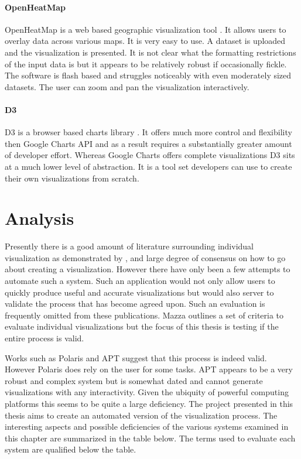 \documentclass[a4paper, 11pt, titlepage, onehalfspacing]{report}
\begin{document}
\paragraph{OpenHeatMap}
OpenHeatMap is a web based geographic visualization tool \cite{openheatmap}. It allows users to overlay data across various maps. It is very easy to use. A dataset is uploaded and the visualization is presented. It is not clear what the formatting restrictions of the input data is but it appears to be relatively robust if occasionally fickle. The software is flash based and struggles noticeably with even moderately sized datasets. The user can zoom and pan the visualization interactively.
\paragraph{D3}
D3 is a browser based charts library \cite{d3}. It offers much more control and flexibility then Google Charts API and as a result requires a substantially greater amount of developer effort. Whereas Google Charts offers complete visualizations D3 sits at a much lower level of abstraction. It is a tool set developers can use to create their own visualizations from scratch. 


\section{Analysis}
Presently there is a good amount of literature surrounding individual visualization as demonstrated by \cite{mazza2009introduction}, and large degree of consensus on how to go about creating a visualization. However there have only been a few attempts to automate such a system. Such an application would not only allow users to quickly produce useful and accurate visualizations but would also server to validate the process that has become agreed upon. Such an evaluation is frequently omitted from these publications. Mazza outlines a set of criteria to evaluate individual visualizations but the focus of this thesis is testing if the entire process is valid. 

Works such as Polaris and APT suggest that this process is indeed valid. However Polaris does rely on the user for some tasks. APT appears to be a very robust and complex system but is somewhat dated and cannot generate visualizations with any interactivity. Given the ubiquity of powerful computing platforms this seems to be quite a large deficiency. The project presented in this thesis aims to create an automated version of the visualization process. The interesting aspects and possible deficiencies of the various systems examined in this chapter are summarized in the table below. The terms used to evaluate each system are qualified below the table.
\end{document}
